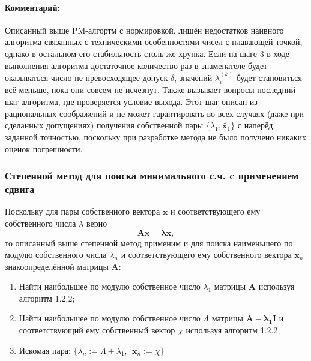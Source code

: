 \paragraph{Комментарий:} Описанный выше PM-алгортм с нормировкой, лишён недостатков наивного алгоритма связанных с техническими особенностями чисел с плавающей точкой, однако в остальном его стабильность столь же хрупка. Если на шаге 3 в ходе выполнения алгоритма достаточное количество раз в знаменателе будет оказываться число не превосходящее допуск $\delta$, значений $\lambda^{(k)}_i$ будет становиться всё меньше, пока они совсем не исчезнут. Также вызывает вопросы последний шаг алгоритма, где проверяется условие выхода. Этот шаг описан из рациональных соображений и не может гарантировать во всех случаях (даже при сделанных допущениях) получения собственной пары $\{\tilde{\lambda_1}, \tilde{\mathbf{x}_1}\}$ с наперёд заданной точностью, поскольку при разработке метода не было получено никаких оценок погрешности.

\subsubsection{Степенной метод для поиска минимального с.ч. c применением сдвига}
Поскольку для пары собственного вектора $\mathbf{x}$ и соответствующего ему собственного числа $\lambda$ верно
\begin{equation}
    \mathbf{Ax=\lambda x},
\end{equation}
то описанный выше степенной метод применим и для поиска наименьшего по модулю собственного числа $\lambda_n$ и соответствующего ему собственного вектора $\mathbf{x}_n$ знакоопределённой матрицы $\mathbf{A}$:
\begin{enumerate}
    \item Найти наибольшее по модулю собственное число $\lambda_1$ матрицы $\mathbf{A}$ используя алгоритм 1.2.2;
    \item Найти наибольшее по модулю собственное число $\Lambda$ матрицы $\mathbf{A-\lambda_1I}$ и соответствующий ему собственный вектор $\chi$ используя алгоритм 1.2.2;
    \item Искомая пара: $\{\lambda_n := \Lambda + \lambda_1, ~~ \mathbf{x}_n := \chi\}$
\end{enumerate}